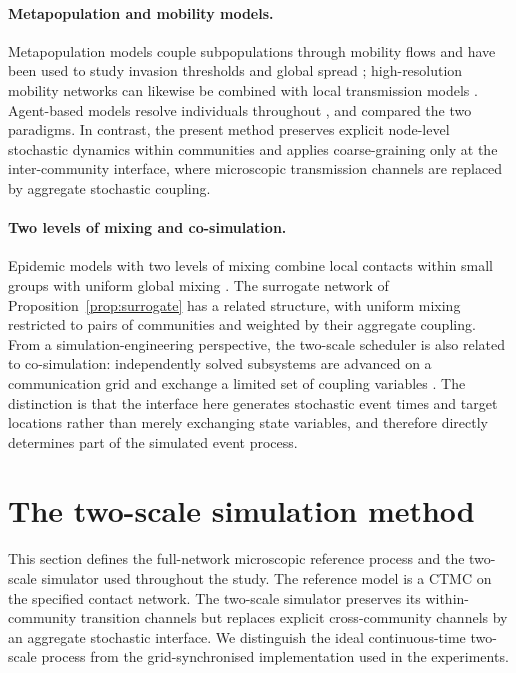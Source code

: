 \documentclass[a4paper,fleqn]{cas-sc}
\begin{document}
\paragraph{Metapopulation and mobility models.}
Metapopulation models couple subpopulations through mobility flows and have been used to study invasion thresholds and global spread \citep{colizza2007reaction,colizza2008,balcan2009,balcan2010modeling}; high-resolution mobility networks can likewise be combined with local transmission models \citep{chang2021}. Agent-based models resolve individuals throughout \citep{eubank2004,kerr2021}, and \citet{ajelli2010} compared the two paradigms. In contrast, the present method preserves explicit node-level stochastic dynamics within communities and applies coarse-graining only at the inter-community interface, where microscopic transmission channels are replaced by aggregate stochastic coupling.

\paragraph{Two levels of mixing and co-simulation.}
Epidemic models with two levels of mixing combine local contacts within small groups with uniform global mixing \citep{ball1997}. The surrogate network of Proposition~\ref{prop:surrogate} has a related structure, with uniform mixing restricted to pairs of communities and weighted by their aggregate coupling. From a simulation-engineering perspective, the two-scale scheduler is also related to co-simulation: independently solved subsystems are advanced on a communication grid and exchange a limited set of coupling variables \citep{gomes2018cosim}. The distinction is that the interface here generates stochastic event times and target locations rather than merely exchanging state variables, and therefore directly determines part of the simulated event process.

\clearpage
\section{The two-scale simulation method}
\label{sec:method}

This section defines the full-network microscopic reference process and the two-scale simulator used throughout the study. The reference model is a CTMC on the specified contact network. The two-scale simulator preserves its within-community transition channels but replaces explicit cross-community channels by an aggregate stochastic interface. We distinguish the ideal continuous-time two-scale process from the grid-synchronised implementation used in the experiments.
\end{document}
